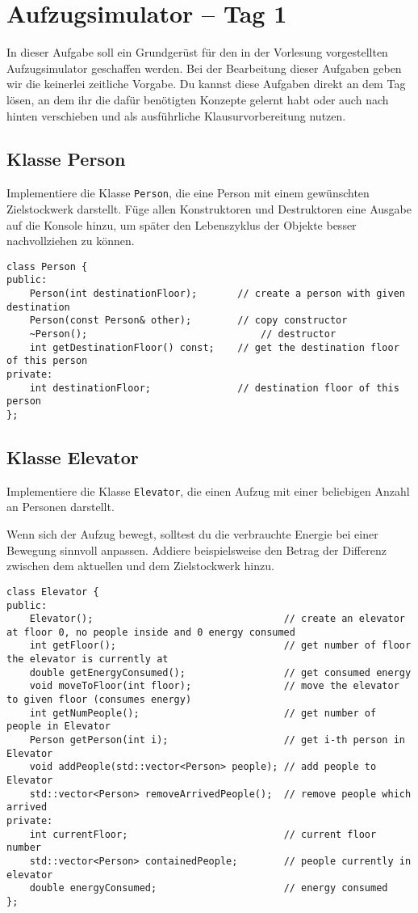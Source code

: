 \section{Aufzugsimulator -- Tag 1}
In dieser Aufgabe soll ein Grundgerüst für den in der Vorlesung vorgestellten Aufzugsimulator geschaffen werden.
Bei der Bearbeitung dieser Aufgaben geben wir die keinerlei zeitliche Vorgabe.
Du kannst diese Aufgaben direkt an dem Tag lösen, an dem ihr die dafür benötigten Konzepte gelernt habt oder auch nach hinten verschieben und als ausführliche Klausurvorbereitung nutzen.

\subsection{Klasse Person}
Implementiere die Klasse \lstinline{Person}, die eine Person mit einem gewünschten Zielstockwerk darstellt.
Füge allen Konstruktoren und Destruktoren eine Ausgabe auf die Konsole hinzu, um später den Lebenszyklus der Objekte besser nachvollziehen zu können.

\begin{lstlisting}
class Person {
public:
    Person(int destinationFloor);       // create a person with given destination
    Person(const Person& other);        // copy constructor
    ~Person();                              // destructor
    int getDestinationFloor() const;    // get the destination floor of this person
private:
    int destinationFloor;               // destination floor of this person
};
\end{lstlisting}

\subsection{Klasse Elevator}
Implementiere die Klasse \lstinline{Elevator}, die einen Aufzug mit einer beliebigen Anzahl an Personen darstellt.

Wenn sich der Aufzug bewegt, solltest du die verbrauchte Energie bei einer Bewegung sinnvoll anpassen.
Addiere beispielsweise den Betrag der Differenz zwischen dem aktuellen und dem Zielstockwerk hinzu.

\begin{lstlisting}
class Elevator {
public:
    Elevator();                                 // create an elevator at floor 0, no people inside and 0 energy consumed
    int getFloor();                             // get number of floor the elevator is currently at
    double getEnergyConsumed();                 // get consumed energy
    void moveToFloor(int floor);                // move the elevator to given floor (consumes energy)
    int getNumPeople();                         // get number of people in Elevator
    Person getPerson(int i);                    // get i-th person in Elevator
    void addPeople(std::vector<Person> people); // add people to Elevator
    std::vector<Person> removeArrivedPeople();  // remove people which arrived
private:
    int currentFloor;                           // current floor number
    std::vector<Person> containedPeople;        // people currently in elevator
    double energyConsumed;                      // energy consumed
};
\end{lstlisting}

